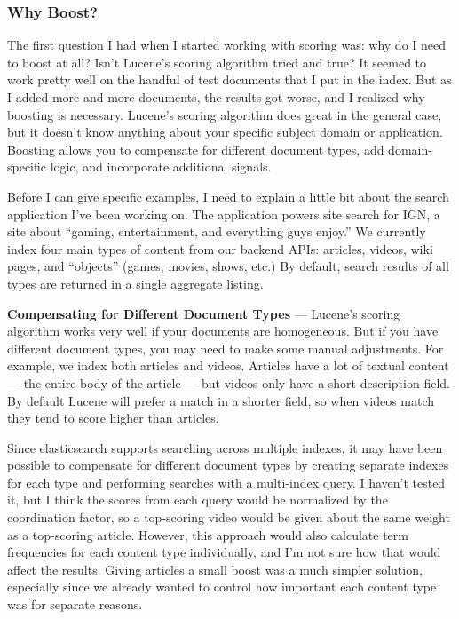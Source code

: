\subsubsection{Why Boost?}
The first question I had when I started working with scoring was: why do I need to boost at all? Isn’t Lucene’s scoring algorithm tried and true? It seemed to work pretty well on the handful of test documents that I put in the index. But as I added more and more documents, the results got worse, and I realized why boosting is necessary. Lucene’s scoring algorithm does great in the general case, but it doesn’t know anything about your specific subject domain or application. Boosting allows you to compensate for different document types, add domain-specific logic, and incorporate additional signals.
\par Before I can give specific examples, I need to explain a little bit about the search application I’ve been working on. The application powers site search for IGN, a site about “gaming, entertainment, and everything guys enjoy.” We currently index four main types of content from our backend APIs: articles, videos, wiki pages, and “objects” (games, movies, shows, etc.) By default, search results of all types are returned in a single aggregate listing.
\par \textbf{Compensating for Different Document Types} — Lucene’s scoring algorithm works very well if your documents are homogeneous. But if you have different document types, you may need to make some manual adjustments. For example, we index both articles and videos. Articles have a lot of textual content — the entire body of the article — but videos only have a short description field. By default Lucene will prefer a match in a shorter field, so when videos match they tend to score higher than articles.
\par Since elasticsearch supports searching across multiple indexes, it may have been possible to compensate for different document types by creating separate indexes for each type and performing searches with a multi-index query. I haven’t tested it, but I think the scores from each query would be normalized by the coordination factor, so a top-scoring video would be given about the same weight as a top-scoring article. However, this approach would also calculate term frequencies for each content type individually, and I’m not sure how that would affect the results. Giving articles a small boost was a much simpler solution, especially since we already wanted to control how important each content type was for separate reasons.
